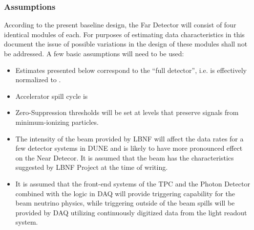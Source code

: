 \subsubsection{Assumptions}
\label{sec:detectors-sc-infrastructure-assumptions}
According to the present baseline design, the Far Detector will consist of four identical modules of \tpcdetectormass each.
For purposes of estimating data characteristics in this document the issue of possible variations in the design of these modules shall not be addressed. A few basic assumptions will need to be used:
\begin{itemize}
\item Estimates presented below correspond to the ``full detector'', i.e. is effectively
normalized to \dunedetectormass.
\item Accelerator spill cycle is \beamspillcycle
\item Zero-Suppression thresholds will be set at levels that preserve signals from minimum-ionizing particles.
\item The intensity of the beam provided by LBNF will affect the data rates for a few detector
systems in DUNE and is likely to have more pronounced effect on the Near Detecor.
It is assumed that the beam has the characteristics suggested by LBNF Project at the time of writing.
\item It is assumed that the front-end systems of the TPC and the Photon Detector combined
with the logic in DAQ will provide triggering capability for the beam neutrino physics, while
triggering outside of the beam spills will be provided by DAQ utilizing continuously digitized
data from the light readout system.
\end{itemize}


